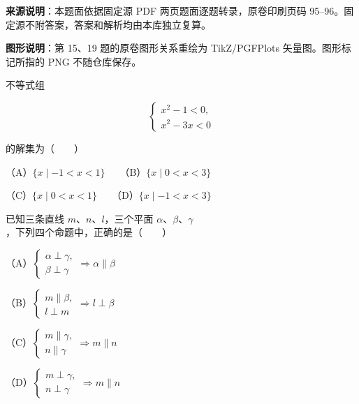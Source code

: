 


\begin{gktip}
\textbf{来源说明}：本题面依据固定源 PDF 两页题面逐题转录，原卷印刷页码 95–96。固定源不附答案，答案和解析均由本库独立复算。

\textbf{图形说明}：第 15、19 题的原卷图形关系重绘为 TikZ/PGFPlots 矢量图。图形标记所指的 PNG 不随仓库保存。
\end{gktip}


\begin{question}
不等式组

\nopagebreak[4]
\[
\begin{cases}
x^2-1<0,\\
x^2-3x<0
\end{cases}
\]

的解集为\mbox{（　　）}

（A）$\{x\mid -1<x<1\}$　　（B）$\{x\mid 0<x<3\}$

（C）$\{x\mid 0<x<1\}$　　（D）$\{x\mid -1<x<3\}$

\end{question}
\begin{question}
已知三条直线 $m\text{、}n\text{、}l$，三个平面 $\alpha\text{、}\beta\text{、}\gamma$，下列四个命题中，正确的是\mbox{（　　）}

（A）$\begin{cases}\alpha\perp\gamma,\\ \beta\perp\gamma\end{cases}\Rightarrow\alpha\parallel\beta$

（B）$\begin{cases}m\parallel\beta,\\ l\perp m\end{cases}\Rightarrow l\perp\beta$

（C）$\begin{cases}m\parallel\gamma,\\ n\parallel\gamma\end{cases}\Rightarrow m\parallel n$

（D）$\begin{cases}m\perp\gamma,\\ n\perp\gamma\end{cases}\Rightarrow m\parallel n$

\end{question}
